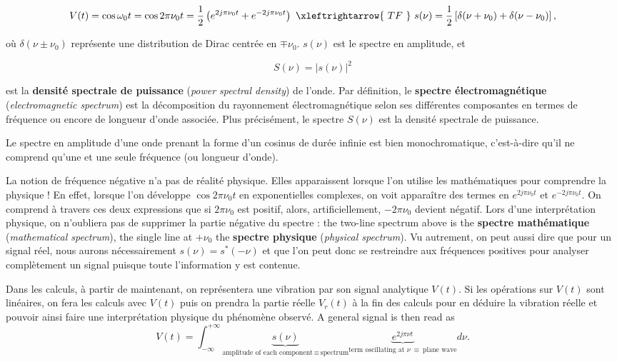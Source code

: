 \[
  V(t)=\cos\omega_0t=\cos 2\pi\nu_0t=\frac{1}{2}\left(e^{2j\pi\nu_0t}+e^{-2j\pi\nu_0t}\right)
  \ \xleftrightarrow{\ TF\ }\
  s(\nu)=\frac{1}{2}\left[\delta(\nu+\nu_0)+\delta(\nu-\nu_0)\right],
\]

où $\delta(\nu\pm\nu_0)$ représente une distribution de Dirac centrée en
$\mp\nu_0$. $s(\nu)$ est le spectre en amplitude, et

\[
  S(\nu)=|s(\nu)|^2
\]

est la \textbf{densité spectrale de puissance} (\textit{power spectral density})
de l'onde. Par définition, le \textbf{spectre électromagnétique}
(\textit{electromagnetic spectrum}) est la décomposition du rayonnement
électromagnétique selon ses différentes composantes en termes de fréquence ou
encore de longueur d'onde associée. Plus précisément, le spectre $S(\nu)$ est la
densité spectrale de puissance.

\begin{conclusion}
  Le spectre en amplitude d'une onde prenant la forme d'un cosinus de durée
  infinie est bien monochromatique, c'est-à-dire qu'il ne comprend qu'une et une
  seule fréquence (ou longueur d'onde).
\end{conclusion}

\begin{remark}
  La notion de fréquence négative n'a pas de réalité physique. Elles
  apparaissent lorsque l'on utilise les mathématiques pour comprendre la
  physique ! En effet, lorsque l'on développe $\cos 2\pi\nu_0t$ en exponentielles
  complexes, on voit apparaître des termes en $e^{2j\pi\nu_0t}$ et
  $e^{-2j\pi\nu_0t}$. On comprend à travers ces deux expressions que si
  $2\pi\nu_0$ est positif, alors, artificiellement, $-2\pi\nu_0$ devient
  négatif. Lors d'une interprétation physique, on n'oubliera pas de supprimer la
  partie négative du spectre : the two-line spectrum above is the
  \textbf{spectre mathématique} (\textit{mathematical spectrum}), the single
  line at $+\nu_0$ the \textbf{spectre physique} (\textit{physical spectrum}).
  Vu autrement, on peut aussi dire que pour un signal réel, nous aurons
  nécessairement $s(\nu)=s^{*}(-\nu)$ et que l'on peut donc se restreindre aux
  fréquences positives pour analyser complètement un signal puisque toute
  l'information y est contenue.
\end{remark}

\begin{notation}
  Dans les calculs, à partir de maintenant, on représentera une vibration par
  son signal analytique $V(t)$. Si les opérations sur $V(t)$ sont linéaires, on
  fera les calculs avec $V(t)$ puis on prendra la partie réelle $V_r(t)$ à la
  fin des calculs pour en déduire la vibration réelle et pouvoir ainsi faire une
  interprétation physique du phénomène observé. A general signal is then read
  as
  \[
    V(t)=\int_{-\infty}^{+\infty}\underbrace{s(\nu)}_{\text{amplitude of each component}\,\equiv\,\text{spectrum}}
      \underbrace{e^{2j\pi\nu t}}_{\text{term oscillating at }\nu\ \equiv\ \text{plane wave}}d\nu .
  \]
\end{notation}

